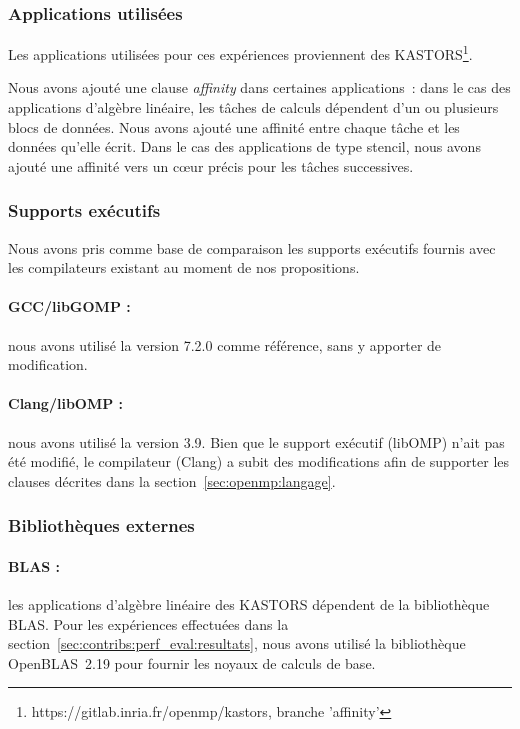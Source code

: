 \subsubsection{Applications utilisées}

Les applications utilisées pour ces expériences proviennent des KASTORS\footnote{https://gitlab.inria.fr/openmp/kastors, branche 'affinity'}.

Nous avons ajouté une clause \emph{affinity} dans certaines applications~: dans le cas des applications d'algèbre linéaire, les tâches de calculs dépendent d'un ou plusieurs blocs de données. Nous avons ajouté une affinité entre chaque tâche et les données qu'elle écrit.
Dans le cas des applications de type stencil, nous avons ajouté une affinité vers un cœur précis pour les tâches successives.


\subsubsection{Supports exécutifs}


Nous avons pris comme base de comparaison les supports exécutifs fournis avec les compilateurs existant au moment de nos propositions.

\paragraph{GCC/libGOMP :} nous avons utilisé la version 7.2.0 comme référence, sans y apporter de modification.

\paragraph{Clang/libOMP :} nous avons utilisé la version 3.9. Bien que le support exécutif (libOMP) n'ait pas été modifié, le compilateur (Clang) a subit des modifications afin de supporter les clauses décrites dans la section~\ref{sec:openmp:langage}.

\subsubsection{Bibliothèques externes}

\paragraph{BLAS :} les applications d'algèbre linéaire des KASTORS dépendent de la bibliothèque BLAS.
Pour les expériences effectuées dans la section~\ref{sec:contribs:perf_eval:resultats}, nous avons utilisé la bibliothèque OpenBLAS~2.19 pour fournir les noyaux de calculs de base.


